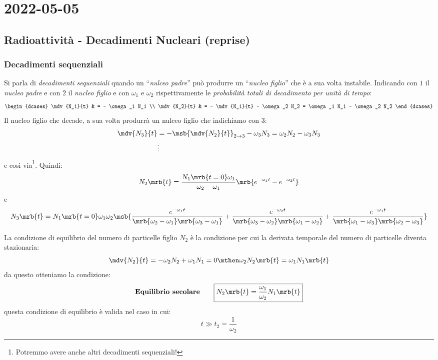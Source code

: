 \chapter{2022-05-05}
\section{Radioattività - Decadimenti Nucleari (reprise)}
\subsection{Decadimenti sequenziali}
Si parla di \textit{decadimenti sequenziali} quando un ``\textit{nulceo
	padre}'' può produrre un ``\textit{nucleo figlio}'' che è a sua volta
instabile. Indicando con $1$ il \textit{nucleo padre} e con $2$ il
\textit{nucleo figlio} e con $\omega_1$ e $\omega_2$ rispettivamente le
\textit{probabilità totali di decadimento per unità di tempo}:
\begin{equation}
	\begin{dcases}
		\mdv{N_1}{t} & = - \omega_1 N_1
		\\
		\mdv{N_2}{t} & = - \mdv{N_1}{t} - \omega_2 N_2 = \omega_1 N_1 - \omega_2 N_2
	\end{dcases}
\end{equation}
Il nucleo figlio che decade, a sua volta produrrà un nulceo figlio che
indichiamo con $3$:
\begin{align*}
	\mdv{N_3}{t} & = - \msb{\mdv{N_2}{t}}_{2\to3} - \omega_3 N_3 = \omega_2 N_2 -
	\omega_3 N_3
	\\
	             & \vdots
\end{align*}
e così via\footnote{
	Potremmo avere anche altri decadimenti sequenziali!
}.
Quindi:
\begin{equation}
	N_2 \mrb{t}
	= \frac{N_1 \mrb{t = 0} \omega_1}{\omega_2 - \omega_1}
	\mrb{e^{-\omega_1 t} - e^{-\omega_2 t }}
\end{equation}
e
\begin{equation}
	N_3 \mrb{t}
	= N_1 \mrb{t = 0} \omega_1 \omega_2
	\msb{
		\frac{e^{-\omega_1 t}}{\mrb{\omega_2 - \omega_1} \mrb{\omega_3 - \omega_1}}
		+
		\frac{e^{-\omega_2 t}}{\mrb{\omega_3 - \omega_2} \mrb{\omega_1 - \omega_2}}
		+
		\frac{e^{-\omega_1 t}}{\mrb{\omega_1 - \omega_3} \mrb{\omega_2 - \omega_3}}
	}
\end{equation}


La condizione di equilibrio del numero di particelle figlio $N_2$ è la
condizione per cui la derivata temporale del numero di particelle diventa
stazionaria:
\begin{equation}
	\mdv{N_2}{t} = -\omega_2 N_2 + \omega_1 N_1 = 0
	\mthen
	\omega_2 N_2 \mrb{t} = \omega_1 N_1 \mrb{t}
\end{equation}
da questo otteniamo la condizione:
\begin{equation}
	\textbf{Equilibrio secolare}
	\qquad
	\boxed{
		N_2 \mrb{t} = \frac{\omega_1}{\omega_2} N_1 \mrb{t}
	}
\end{equation}
questa condizione di equilibrio è valida nel caso in cui:
\begin{equation}
	t \gg t_2 = \frac{1}{\omega_2}
\end{equation}

